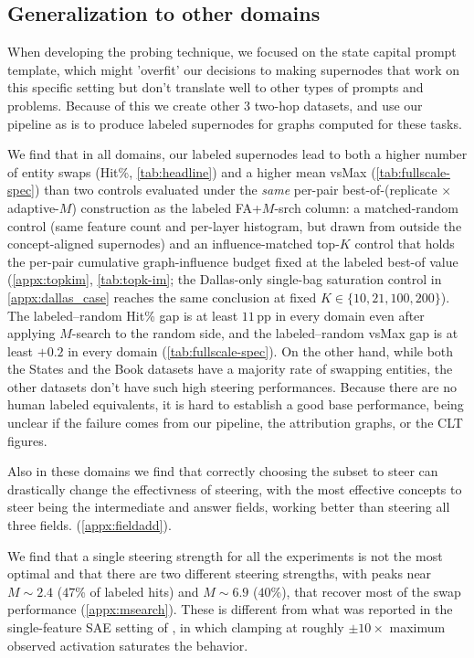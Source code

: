




\subsection{Generalization to other domains}

When developing the probing technique, we focused on the state capital prompt template, which might 'overfit' our decisions to making supernodes that work on this specific setting but don't translate well to other types of prompts and problems. Because of this we create other 3 two-hop datasets, and use our pipeline as is to produce labeled supernodes for graphs computed for these tasks. 

We find that in all domains, our labeled supernodes lead to both a higher number of entity swaps (Hit\%, \cref{tab:headline}) and a higher mean vsMax (\cref{tab:fullscale-spec}) than two controls evaluated under the \emph{same} per-pair best-of-(replicate $\times$ adaptive-$M$) construction as the labeled FA+$M$-srch column: a matched-random control (same feature count and per-layer histogram, but drawn from outside the concept-aligned supernodes) and an influence-matched top-$K$ control that holds the per-pair cumulative graph-influence budget fixed at the labeled best-of value (\cref{appx:topkim}, \cref{tab:topk-im}; the Dallas-only single-bag saturation control in \cref{appx:dallas_case} reaches the same conclusion at fixed $K \in \{10, 21, 100, 200\}$). The labeled--random Hit\% gap is at least $11$\,pp in every domain even after applying $M$-search to the random side, and the labeled--random vsMax gap is at least $+0.2$ in every domain (\cref{tab:fullscale-spec}). On the other hand, while both the States and the Book datasets have a majority rate of swapping entities, the other datasets don't have such high steering performances. Because there are no human labeled equivalents, it is hard to establish a good base performance, being unclear if the failure comes from our pipeline, the attribution graphs, or the CLT figures.  

Also in these domains we find that correctly choosing the subset to steer can drastically change the effectivness of steering, with the most effective concepts to steer being the intermediate and answer fields, working better than steering all three fields. (\cref{appx:fieldadd}). 

We find that a single steering strength for all the experiments is not the most optimal and that there are two different steering strengths, with peaks near $M{\sim}2.4$ ($47$\% of labeled hits) and $M{\sim}6.9$ ($40$\%), that recover most of the swap performance (\cref{appx:msearch}).  These is different from what was reported in the single-feature SAE setting of \citet{templeton2024scaling}, in which clamping at roughly $\pm 10\times$ maximum observed activation saturates the behavior.

